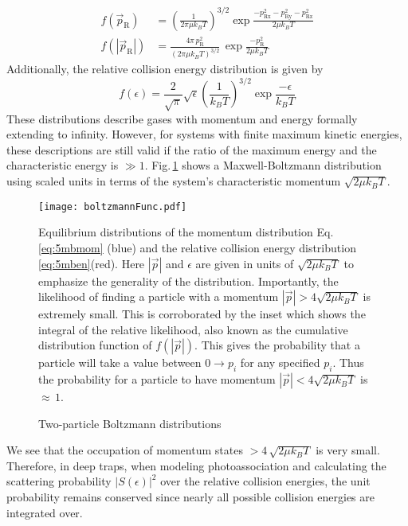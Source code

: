 \begingroup
\addtolength{\jot}{1em}
\begin{align}
\label{eq:5mbmom}
	 f( \vec{p}_\text{R} ) &= \left( \frac{1}{2 \pi \mu k_B T} \right)^{3/2} \exp{\frac{-p_\text{Rx}^2-p_\text{Ry}^2-p_\text{Rz}^2}{2 \mu k_B T}} \\
	 \label{eq:5mben}
	 f( |\vec{p}_\text{R}| ) &= \frac{4 \pi \, p_\text{R}^2}{\left( 2 \pi \mu k_B T \right)^{3/2}}\,\exp{\frac{-p_\text{R}^2}{2 \mu k_B T}}
\end{align}
\endgroup
Additionally, the relative collision energy distribution is given by
\begin{equation}
	 f( \epsilon ) = \frac{2}{\sqrt{\pi}} \sqrt{\epsilon} \left( \frac{1}{ k_B T} \right)^{3/2} \exp{\frac{-\epsilon}{k_B T}}
\end{equation}
These distributions describe gases with momentum and energy formally extending to infinity.
However, for systems with finite maximum kinetic energies, these descriptions are still valid if the ratio of the maximum energy and the characteristic energy is $\gg 1$.
Fig.\,\ref{fig:singleBoltz} shows a Maxwell-Boltzmann distribution using scaled units in terms of the system's characteristic momentum $\sqrt{2 \mu k_B T}$.
	\begin{figure} 
		\centerline{
		\texttt{[image: boltzmannFunc.pdf]}}
		\caption{Two-particle Boltzmann distributions}{Equilibrium distributions of the momentum distribution Eq.\,\ref{eq:5mbmom} (blue) and the relative collision energy distribution \ref{eq:5mben}(red). Here $|\vec{p}|$ and $\epsilon$ are given in units of $\sqrt{2 \mu k_B T}$ to emphasize the generality of the distribution. Importantly, the likelihood of finding a particle with a momentum $|\vec{p}| > 4\sqrt{2 \mu k_B T}$ is extremely small. This is corroborated by the inset which shows the integral of the relative likelihood, also known as the cumulative distribution function of $f(|\vec{p}|)$. This gives the probability that a particle will take a value between $0 \rightarrow p_i$ for any specified $p_i$. Thus the probability for a particle to have momentum $|\vec{p}| < 4\sqrt{2 \mu k_B T}$ is $\approx\,1$.}
		\label{fig:singleBoltz}
	\end{figure}
We see that the occupation of momentum states $> 4\,\sqrt{2 \mu k_B T}$ is very small.
Therefore, in deep traps, when modeling photoassociation and calculating the scattering probability $\vert S(\epsilon) \vert^2$ over the relative collision energies, the unit probability remains conserved since nearly all possible collision energies are integrated over.
